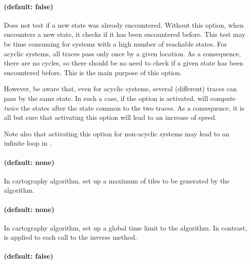 \paragraph{ (default: false)}
Does not test if a new state was already encountered.
Without this option, when \imitator{} encounters a new state, it checks if it has been encountered before.
This test may be time consuming for systems with a high number of reachable states.
For acyclic systems, all traces pass only once by a given location.
As a consequence, there are no cycles, so there should be no need to check if a given state has been encountered before.
This is the main purpose of this option.

However, be aware that, even for acyclic systems, several (different) traces can pass by the same state.
In such a case, if the  option is activated, \imitator{} will compute \emph{twice} the states after the state common to the two traces.
As a consequence, it is all but sure that activating this option will lead to an increase of speed.

Note also that activating this option for non-acyclic systems may lead to an infinite loop in \imitator{}.


\paragraph{ (default: none)}

In cartography algorithm, set up a maximum of tiles to be generated by the algorithm.


\paragraph{ (default: none)}

In cartography algorithm, set up a global time limit to the algorithm.
In contrast,  is applied to each call to the inverse method.


\paragraph{ (default: false)}


